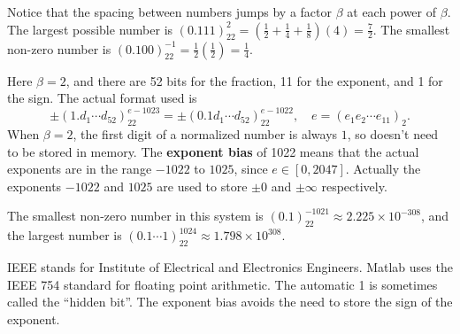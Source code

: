 \documentclass[
  letterpaper,
  DIV=11,
  numbers=noendperiod]{scrreprt}
\begin{document}
\begin{tcolorbox}[enhanced jigsaw, arc=.35mm, toprule=.15mm, colframe=quarto-callout-note-color-frame, left=2mm, toptitle=1mm, titlerule=0mm, breakable, opacityback=0, bottomtitle=1mm, title=\textcolor{quarto-callout-note-color}{\faInfo}\hspace{0.5em}{Note}, rightrule=.15mm, opacitybacktitle=0.6, colbacktitle=quarto-callout-note-color!10!white, colback=white, leftrule=.75mm, bottomrule=.15mm, coltitle=black]

Notice that the spacing between numbers jumps by a factor \(\beta\) at
each power of \(\beta\). The largest possible number is
\((0.111)_22^2 = (\tfrac12 + \tfrac14 + \tfrac18)(4) = \tfrac72\). The
smallest non-zero number is
\((0.100)_22^{-1}=\tfrac12(\tfrac12) = \tfrac14\).

\end{tcolorbox}

Here \(\beta=2\), and there are 52 bits for the fraction, 11 for the
exponent, and 1 for the sign. The actual format used is \[
\pm (1.d_1\cdots d_{52})_22^{e-1023} = \pm (0.1d_1\cdots d_{52})_22^{e-1022}, \quad e = (e_1e_2\cdots e_{11})_2.
\] When \(\beta=2\), the first digit of a normalized number is always
\(1\), so doesn't need to be stored in memory. The \textbf{exponent
bias} of 1022 means that the actual exponents are in the range \(-1022\)
to \(1025\), since \(e\in[0,2047]\). Actually the exponents \(-1022\)
and \(1025\) are used to store \(\pm 0\) and \(\pm\infty\) respectively.

The smallest non-zero number in this system is
\((0.1)_22^{-1021} \approx 2.225\times 10^{-308}\), and the largest
number is \((0.1\cdots 1)_22^{1024} \approx 1.798\times 10^{308}\).

\begin{tcolorbox}[enhanced jigsaw, arc=.35mm, toprule=.15mm, colframe=quarto-callout-note-color-frame, left=2mm, toptitle=1mm, titlerule=0mm, breakable, opacityback=0, bottomtitle=1mm, title=\textcolor{quarto-callout-note-color}{\faInfo}\hspace{0.5em}{Note}, rightrule=.15mm, opacitybacktitle=0.6, colbacktitle=quarto-callout-note-color!10!white, colback=white, leftrule=.75mm, bottomrule=.15mm, coltitle=black]

IEEE stands for Institute of Electrical and Electronics Engineers.
Matlab uses the IEEE 754 standard for floating point arithmetic. The
automatic 1 is sometimes called the ``hidden bit''. The exponent bias
avoids the need to store the sign of the exponent.

\end{tcolorbox}
\end{document}
